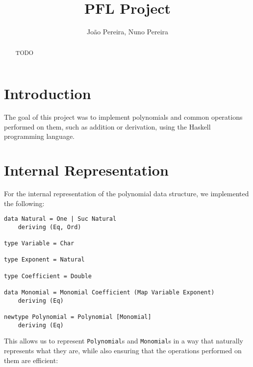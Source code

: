 \documentclass[11pt,a4paper]{article}
\title{PFL Project}
\author{João Pereira, Nuno Pereira}
\begin{document}
\maketitle

\pagebreak

\begin{abstract}
    TODO
\end{abstract}

\tableofcontents

\pagebreak

\section{Introduction}

The goal of this project was to implement polynomials and common operations performed on them, such as addition or derivation, using the Haskell programming language.

\section{Internal Representation}

For the internal representation of the polynomial data structure, we implemented the following:

\begin{lstlisting}
data Natural = One | Suc Natural
    deriving (Eq, Ord)

type Variable = Char

type Exponent = Natural

type Coefficient = Double

data Monomial = Monomial Coefficient (Map Variable Exponent)
    deriving (Eq)

newtype Polynomial = Polynomial [Monomial]
    deriving (Eq)
\end{lstlisting}

This allows us to represent \lstinline{Polynomial}s and \lstinline{Monomial}s in a way that naturally represents what they are, while also ensuring that the operations performed on them are efficient:
\end{document}
